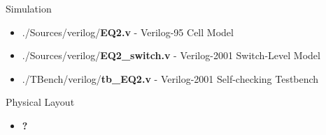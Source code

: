 \begin{center}
    Simulation
    \begin{itemize}
        \item ./Sources/verilog/\textbf{EQ2.v} - Verilog-95 Cell Model
        \item ./Sources/verilog/\textbf{EQ2\_switch.v} - Verilog-2001 Switch-Level Model
        \item ./TBench/verilog/\textbf{tb\_EQ2.v} - Verilog-2001 Self-checking Testbench
    \end{itemize}
    Physical Layout
    \begin{itemize}
        \item \textbf{?}
    \end{itemize}
\end{center}
